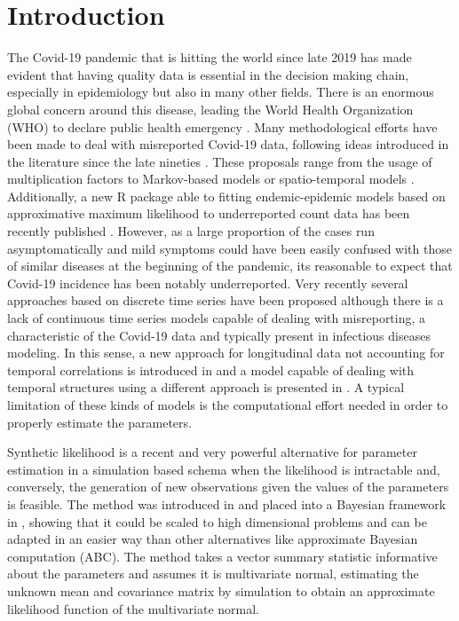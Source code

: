 \documentclass{article}
\begin{document}
\section{Introduction}\label{intro}
The Covid-19 pandemic that is hitting the world since late 2019 has made evident that having quality data is essential in the decision making chain, especially in epidemiology but also in many other fields. There is an enormous global concern around this disease, leading the World Health Organization (WHO) to declare public health emergency \cite{Sohrabi2020}. Many methodological efforts have been made to deal with misreported Covid-19 data, following ideas introduced in the literature since the late nineties \cite{Bernard2014,Arendt2013,Rosenman2006,Alfonso2015,Winkelmann1996,Gibbons2014}. These proposals range from the usage of multiplication factors \cite{Stocks2018} to Markov-based models \cite{Azmon2014,Magal2018} or spatio-temporal models \cite{Stoner2019}. Additionally, a new R \cite{RCoreTeam2019} package able to fitting endemic-epidemic models based on approximative maximum likelihood to underreported count data has been recently published \cite{JohannesBracher2019}. However, as a large proportion of the cases run asymptomatically \cite{Oran2020} and mild symptoms could have been easily confused with those of similar diseases at the beginning of the pandemic, its reasonable to expect that Covid-19 incidence has been notably underreported. Very recently several approaches based on discrete time series have been proposed \cite{Fernandez-Fontelo2016,FernandezFontelo2019,Fernandez-Fontelo2020} although there is a lack of continuous time series models capable of dealing with misreporting, a characteristic of the Covid-19 data and typically present in infectious diseases modeling. In this sense, a new approach for longitudinal data not accounting for temporal correlations is introduced in \cite{Morina2021} and a model capable of dealing with temporal structures using a different approach is presented in \cite{Morina2020}. A typical limitation of these kinds of models is the computational effort needed in order to properly estimate the parameters.

Synthetic likelihood is a recent and very powerful alternative for parameter estimation in a simulation based schema when the likelihood is intractable and, conversely, the generation of new observations given the values of the parameters is feasible. The method was introduced in \cite{Wood2010} and placed into a Bayesian framework in \cite{Price2018}, showing that it could be scaled to high dimensional problems and can be adapted in an easier way than other alternatives like approximate Bayesian computation (ABC). The method takes a vector summary statistic informative about the parameters and assumes it is multivariate normal, estimating the unknown mean and covariance matrix by simulation to obtain an approximate likelihood function of the multivariate normal.  
\end{document}
